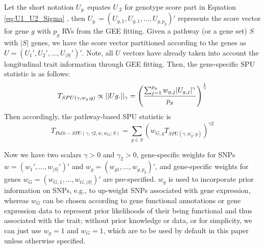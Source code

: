 \documentclass[12pt]{article}
\begin{document}
Let the short notation $U_{g.}$ equates $U_{.2}$ for genotype score part in Equation \ref{eq:U1_U2_Sigma} %
, then $U_{g.} = (U_{g,1},U_{g,1},\ldots, U_{g,p_g})'$ represents the score vector for gene $g$ with $p_g$ RVs from the GEE fitting. Given a pathway (or a gene set) $S$ with $|S|$ genes, we have the score vector partitioned according to the genes as $U = (U_1',U_2',\ldots, U_{|S|}')'$. Note, all $U$ vectors have already taken into account the longitudinal trait information through GEE fitting. Then, the gene-specific SPU statistic is as follows:
\begin{equation}
T_ { SPU(\gamma, w_g; g) } \propto || Ug.||_{\gamma} =  \left( \frac{  \sum_{j=1} ^ {p_g} w_{g,j} |U_{g, j}| ^ { \gamma }  }{p_g} \right) ^ { 1 \over \gamma }
\end{equation}  
Then accordingly, the pathway-based SPU statistic is
\begin{equation}
T _ { Path-SPU(\gamma, \gamma2, w, w_G; S) } = \sum_{g \in S} ( w_{G,g} T_ { SPU(\gamma, w_g ; g) } ) ^ {\gamma2}
\end{equation}  

Now we have two scalars $\gamma > 0$ and $\gamma_2 > 0$, gene-specific weights for SNPs $w = (w_1', \ldots,w_{|S|}')'$ and $w_g = (w_{g1}, \ldots, w_{g, p_g})'$, and gene-specific weights for genes $w_G = (w_{G,1}, \ldots, w_{G,|S|})'$ are pre-specified. $w_g$ is used to incorporate prior information on SNPs, e.g., to up-weight SNPs associated with gene expression, whereas $w_G$ can be chosen according to gene functional annotations or gene expression data to represent prior likelihoods of their being functional and thus associated with the trait; without prior knowledge or data, or for simplicity, we can just use $w_g = 1$ and $w_G = 1$, which are to be used by default in this paper unless otherwise specified.
\end{document}

